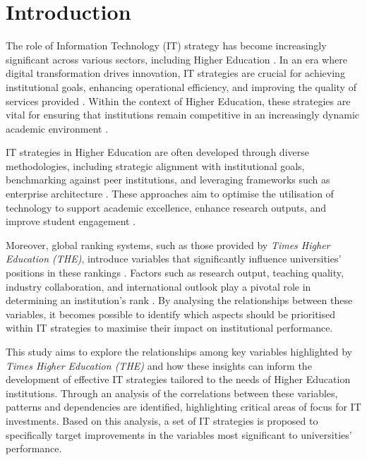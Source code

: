 \documentclass[sigconf]{acmart}
\begin{document}
\maketitle

\section{Introduction}


The role of Information Technology (IT) strategy has become increasingly significant across various sectors, including Higher Education \cite{hashim2021higher}. In an era where digital transformation drives innovation, IT strategies are crucial for achieving institutional goals, enhancing operational efficiency, and improving the quality of services provided \cite{rahmadi2024research}. Within the context of Higher Education, these strategies are vital for ensuring that institutions remain competitive in an increasingly dynamic academic environment \cite{fernandez2023digital}.

IT strategies in Higher Education are often developed through diverse methodologies, including strategic alignment with institutional goals, benchmarking against peer institutions, and leveraging frameworks such as enterprise architecture \cite{bianchi2023it}. These approaches aim to optimise the utilisation of technology to support academic excellence, enhance research outputs, and improve student engagement \cite{digitalsystems2022strategy}.

Moreover, global ranking systems, such as those provided by \textit{Times Higher Education (THE)}, introduce variables that significantly influence universities' positions in these rankings \cite{times2023methodology}. Factors such as research output, teaching quality, industry collaboration, and international outlook play a pivotal role in determining an institution’s rank \cite{times2022rankings}. By analysing the relationships between these variables, it becomes possible to identify which aspects should be prioritised within IT strategies to maximise their impact on institutional performance.


This study aims to explore the relationships among key variables highlighted by \textit{Times Higher Education (THE)} and how these insights can inform the development of effective IT strategies tailored to the needs of Higher Education institutions. Through an analysis of the correlations between these variables, patterns and dependencies are identified, highlighting critical areas of focus for IT investments. Based on this analysis, a set of IT strategies is proposed to specifically target improvements in the variables most significant to universities' performance.
\end{document}
